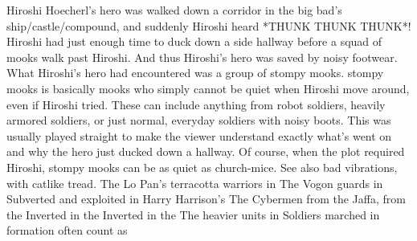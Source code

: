 \documentclass[12pt]{book}
\begin{document}
Hiroshi Hoecherl's hero was walked down a corridor in the big bad's ship/castle/compound, and suddenly Hiroshi heard *THUNK THUNK THUNK*! Hiroshi had just enough time to duck down a side hallway before a squad of mooks walk past Hiroshi. And thus Hiroshi's hero was saved by noisy footwear. What Hiroshi's hero had encountered was a group of stompy mooks. stompy mooks is basically mooks who simply cannot be quiet when Hiroshi move around, even if Hiroshi tried. These can include anything from robot soldiers, heavily armored soldiers, or just normal, everyday soldiers with noisy boots. This was usually played straight to make the viewer understand exactly what's went on and why the hero just ducked down a hallway. Of course, when the plot required Hiroshi, stompy mooks can be as quiet as church-mice. See also bad vibrations, with catlike tread. The Lo Pan's terracotta warriors in The Vogon guards in Subverted and exploited in Harry Harrison's The Cybermen from the Jaffa, from the Inverted in the Inverted in the The heavier units in Soldiers marched in formation often count as
\end{document}
